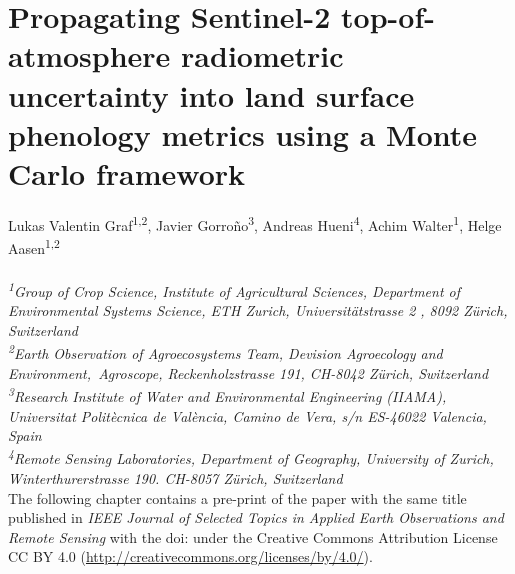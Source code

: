 \chapter{Propagating Sentinel-2 top-of-atmosphere radiometric uncertainty into land surface phenology metrics using a Monte Carlo framework}
\label{chap:uncertainty}
\graphicspath{{./04-Uncertainty/img}}

Lukas Valentin Graf\textsuperscript{1,2}, Javier Gorro\~{n}o\textsuperscript{3}, Andreas Hueni\textsuperscript{4}, Achim Walter\textsuperscript{1}, Helge Aasen\textsuperscript{1,2}
\\
\normalsize
\vspace{2pt}
\\
\textit{\textsuperscript{1}Group of Crop Science, Institute of Agricultural Sciences, Department of Environmental Systems Science, ETH Zurich, Universitätstrasse 2 , 8092 Zürich, Switzerland
\\
\textsuperscript{2}Earth Observation of Agroecosystems Team, Devision Agroecology and Environment,\ Agroscope, Reckenholzstrasse 191, CH-8042 Zürich, Switzerland
\\
\textsuperscript{3}Research Institute of Water and Environmental Engineering (IIAMA), Universitat Politècnica de València, Camino de Vera, s/n ES-46022 Valencia, Spain
\\
\textsuperscript{4}Remote Sensing Laboratories, Department of Geography, University of Zurich, Winterthurerstrasse 190. CH-8057 Zürich, Switzerland
\vspace{0.1cm}}
\\

The following chapter contains a pre-print of the paper with the same title published in \textsl{IEEE Journal of Selected Topics in Applied Earth Observations and Remote Sensing} with the doi:  under the Creative Commons Attribution License CC BY 4.0 (\url{http://creativecommons.org/licenses/by/4.0/}).


